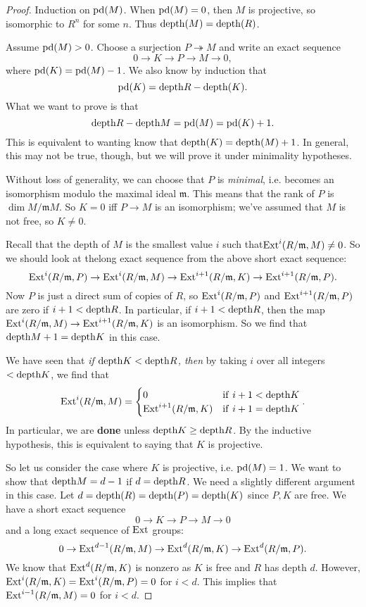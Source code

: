 \begin{proof}
Induction on $\mathrm{pd}(M)$. When $\mathrm{pd}(M)=0$, then $M$ is projective,
so isomorphic
to $R^n$ for some $n$. Thus $\mathrm{depth}(M) = \mathrm{depth}(R)$.

Assume $\mathrm{pd}(M) > 0$.
Choose a surjection $P \twoheadrightarrow M$ and write an exact
sequence
\[ 0 \to K \to P \to M \to 0,  \]
where $\mathrm{pd}(K) = \mathrm{pd}(M)-1$. We also know by induction that
\[ \mathrm{pd}(K) = \mathrm{depth} R - \mathrm{depth}(K).  \]
What we want to prove is that
\[ \mathrm{depth} R - \mathrm{depth} M = \mathrm{pd}(M) = \mathrm{pd}(K)+1.  \]
This is equivalent to wanting know that $\mathrm{depth}(K) = \mathrm{depth} (M)
+1$.
In general, this may not be true, though, but we will prove it
under
minimality hypotheses.

Without loss of generality, we can choose that $P$ is
\emph{minimal}, i.e.
becomes an isomorphism modulo the maximal ideal $\mathfrak{m}$.
This means
that the rank of $P$ is $\dim M/\mathfrak{m}M$.
So $K = 0$ iff $P \to M$ is an isomorphism; we've assumed that
$M$ is not
free, so $K \neq 0$.

Recall that the depth of $M$ is the smallest value $i$ such
that$\mathrm{Ext}^i(R/\mathfrak{m}, M) \neq 0$. So we should look at thelong exact
sequence from the above short exact sequence:
\[ \mathrm{Ext}^i(R/\mathfrak{m}, P) \to  \mathrm{Ext}^i(R/\mathfrak{m},M)  \to
\mathrm{Ext}^{i+1}(R/\mathfrak{m}, K) \to \mathrm{Ext}^{i+1}(R/\mathfrak{m},
P).\]
Now $P$ is just a direct sum of copies of $R$, so
$\mathrm{Ext}^i(R/\mathfrak{m}, P)$
and $\mathrm{Ext}^{i+1}(R/\mathfrak{m}, P)$ are zero if $i+1< \mathrm{depth} R$.
In
particular, if $i+1< \mathrm{depth} R$, then the map $
\mathrm{Ext}^i(R/\mathfrak{m},M) \to
\mathrm{Ext}^{i+1}(R/\mathfrak{m}, K) $ is an isomorphism.
So we find that $\mathrm{depth} M + 1 = \mathrm{depth} K$ in this case.

We have seen that \emph{if $\mathrm{depth} K < \mathrm{depth} R$, then } by
taking $i$ over
all integers $< \mathrm{depth} K$, we find that
\[ \mathrm{Ext}^{i}(R/\mathfrak{m}, M) = \begin{cases}
0 & \mathrm{if \ } i+1 < \mathrm{depth} K \\
\mathrm{Ext}^{i+1}(R/\mathfrak{m},K) & \mathrm{if \ } i+1 = \mathrm{depth} K
\end{cases}. \]
In particular, we are \textbf{done} unless $\mathrm{depth} K \geq \mathrm{depth}
R$.
By the inductive hypothesis, this is equivalent to saying that
$K$ is
projective.

So let us consider the case where $K$ is projective, i.e.
$\mathrm{pd}(M)=1$.
We want to show that $\mathrm{depth} M = d-1$ if $d = \mathrm{depth} R$.
We need a
slightly different argument in this case. Let $d = \mathrm{depth}(R) =
\mathrm{depth} (P) =
\mathrm{depth}(K)$ since $P,K$ are free. We have a short exact sequence
\[ 0 \to K \to P \to M \to 0  \]
and a long exact sequence of $\mathrm{Ext}$ groups:
\[ 0 \to \mathrm{Ext}^{d-1}(R/\mathfrak{m}, M) \to
\mathrm{Ext}^d(R/\mathfrak{m}, K) \to \mathrm{Ext}^d(R/\mathfrak{m}, P) .\]
We know that $\mathrm{Ext}^d(R/\mathfrak{m}, K)$ is nonzero as $K$ is
free and $R$ has
depth $d$. However, $\mathrm{Ext}^i(R/\mathfrak{m}, K) =
\mathrm{Ext}^i(R/\mathfrak{m}, P)=0$
for $i<d$. This implies that $\mathrm{Ext}^{i-1}(R/\mathfrak{m}, M)=0$
for $i<d$.


\end{proof}
